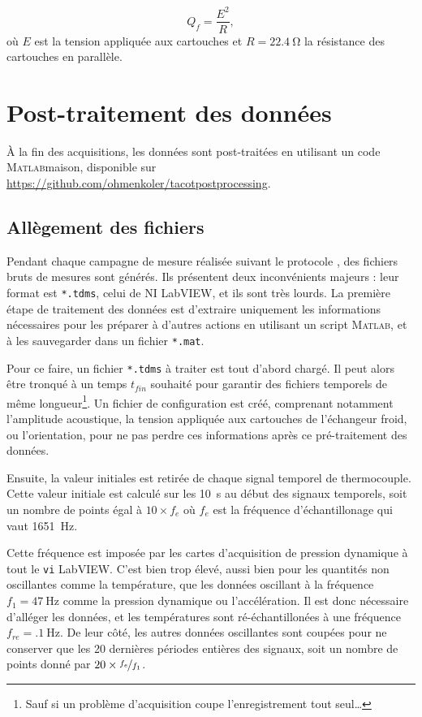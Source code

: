 \begin{equation}
	Q_f = \frac{E^2}{R},
	\label{eq:Qf_définitionEsurR}
\end{equation}
où $E$ est la tension appliquée aux cartouches et $R=\qty{22.4}{\ohm}$ la résistance des cartouches en parallèle. 

\section{Post-traitement des données}
À la fin des acquisitions, les données sont post-traitées en utilisant un code \textsc{Matlab}\textss\textregistered maison, disponible sur \url{https://github.com/ohmenkoler/tacotpostprocessing}.

\subsection{Allègement des fichiers}
Pendant chaque campagne de mesure réalisée suivant le protocole , des fichiers bruts de mesures sont générés. Ils présentent deux inconvénients majeurs : leur format est \texttt{*.tdms}, celui de NI LabVIEW, et ils sont très lourds. La première étape de traitement des données est d'extraire uniquement les informations nécessaires pour les préparer à d'autres actions en utilisant un script \textsc{Matlab}\textss\textregistered, et à les sauvegarder dans un fichier \texttt{*.mat}.\medskip

Pour ce faire, un fichier \texttt{*.tdms} à traiter est tout d'abord chargé. Il peut alors être tronqué à un temps $t_{fin}$ souhaité pour garantir des fichiers temporels de même longueur\footnote{Sauf si un problème d'acquisition coupe l'enregistrement tout seul\dots}. Un fichier de configuration est créé, comprenant notamment l'amplitude acoustique, la tension appliquée aux cartouches de l'échangeur froid, ou l'orientation, pour ne pas perdre ces informations après ce pré-traitement des données.\smallskip

Ensuite, la valeur initiales est retirée de chaque signal temporel de thermocouple. Cette valeur initiale est calculé sur les \qty{10}{\second} au début des signaux temporels, soit un nombre de points égal à $10 \times f_{e}$ où $f_{e}$ est la fréquence d'échantillonage qui vaut \qty{1651}{\hertz}.\smallskip

Cette fréquence est imposée par les cartes d'acquisition de pression dynamique à tout le \texttt{vi} LabVIEW. C'est bien trop élevé, aussi bien pour les quantités non oscillantes comme la température, que les données oscillant à la fréquence $f_1=\qty{47}{\hertz}$ comme la pression dynamique ou l'accélération. Il est donc nécessaire d'alléger les données, et les températures sont ré-échantillonées à une fréquence $f_{re}=\qty{.1}{\hertz}$. De leur côté, les autres données oscillantes sont coupées pour ne conserver que les \num{20} dernières périodes entières des signaux, soit un nombre de points donné par $20 \times \nicefrac{f_e}{f_1}$.\smallskip

